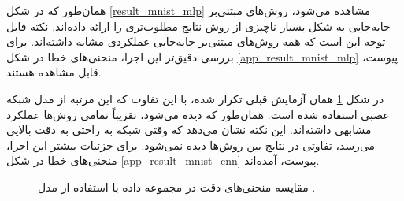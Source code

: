 همان‌طور که در شکل
\ref{result_mnist_mlp} 
مشاهده می‌شود، روش‌های مبتنی‌بر جابه‌جایی به شکل بسیار ناچیزی از روش
نتایج مطلوب‌تری را ارائه داده‌اند. نکته قابل توجه این است که همه روش‌های مبتنی‌بر جابه‌جایی عملکردی مشابه داشته‌اند. برای بررسی دقیق‌تر این اجرا، منحنی‌های خطا در شکل
\ref{app_result_mnist_mlp}
پیوست، قابل مشاهده هستند.


در شکل
\ref{result_mnist_cnn}
همان آزمایش قبلی تکرار شده، با این تفاوت که این مرتبه از مدل شبکه عصبی
استفاده شده است. همان‌طور که دیده می‌شود، تقریباً تمامی روش‌ها عملکرد مشابهی داشته‌اند. این نکته نشان می‌دهد که وقتی شبکه به راحتی به دقت بالایی می‌رسد، تفاوتی در نتایج بین روش‌ها دیده نمی‌شود. برای جزئیات بیشتر این اجرا، منحنی‌های خطا در شکل
\ref{app_result_mnist_cnn}
پیوست، آمده‌اند.


\begin{figure}[b]
	\centering
	\hspace{0.8mm}
	\caption{
		مقایسه منحنی‌های دقت در مجموعه داده
		با استفاده از مدل
		.
	}
	\label{result_mnist_cnn}
\end{figure}





